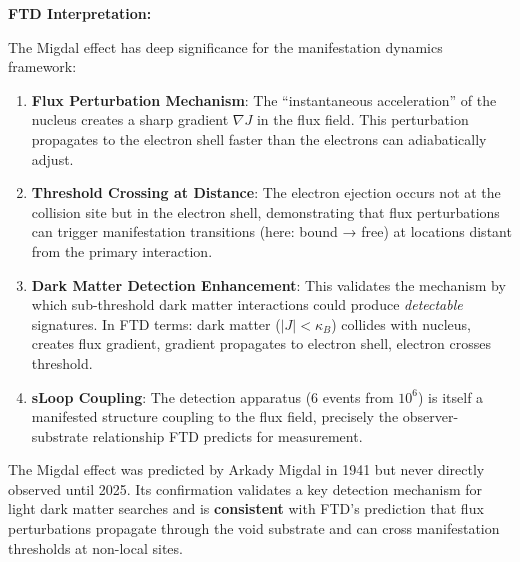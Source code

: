 \documentclass[
  11pt,
  letterpaper,
  twoside,
  openany]{book}
\begin{document}
\textbf{FTD Interpretation:}

The Migdal effect has deep significance for the manifestation dynamics
framework:

\begin{enumerate}
\def\labelenumi{\arabic{enumi}.}
\item
  \textbf{Flux Perturbation Mechanism}: The ``instantaneous
  acceleration'' of the nucleus creates a sharp gradient \(\nabla J\) in
  the flux field. This perturbation propagates to the electron shell
  faster than the electrons can adiabatically adjust.
\item
  \textbf{Threshold Crossing at Distance}: The electron ejection occurs
  not at the collision site but in the electron shell, demonstrating
  that flux perturbations can trigger manifestation transitions (here:
  bound → free) at locations distant from the primary interaction.
\item
  \textbf{Dark Matter Detection Enhancement}: This validates the
  mechanism by which sub-threshold dark matter interactions could
  produce \emph{detectable} signatures. In FTD terms: dark matter
  (\(|J| < \kappa_B\)) collides with nucleus, creates flux gradient,
  gradient propagates to electron shell, electron crosses threshold.
\item
  \textbf{sLoop Coupling}: The detection apparatus (6 events from
  \(10^6\)) is itself a manifested structure coupling to the flux field,
  precisely the observer-substrate relationship FTD predicts for
  measurement.
\end{enumerate}

\begin{tcolorbox}[enhanced jigsaw, colbacktitle=quarto-callout-note-color!10!white, titlerule=0mm, bottomtitle=1mm, bottomrule=.15mm, colback=white, arc=.35mm, breakable, toprule=.15mm, title=\textcolor{quarto-callout-note-color}{\faInfo}\hspace{0.5em}{Epistemic Note}, rightrule=.15mm, coltitle=black, leftrule=.75mm, colframe=quarto-callout-note-color-frame, toptitle=1mm, opacityback=0, opacitybacktitle=0.6, left=2mm]

The Migdal effect was predicted by Arkady Migdal in 1941 but never
directly observed until 2025. Its confirmation validates a key detection
mechanism for light dark matter searches and is \textbf{consistent} with
FTD's prediction that flux perturbations propagate through the void
substrate and can cross manifestation thresholds at non-local sites.

\end{tcolorbox}
\end{document}
